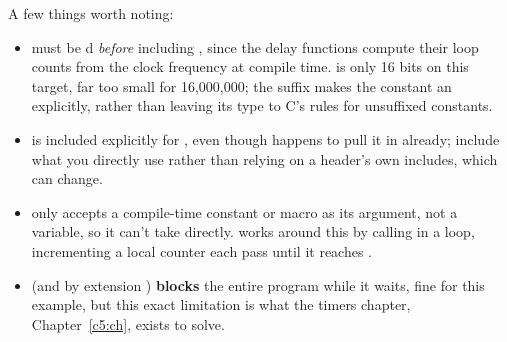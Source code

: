 \noindent A few things worth noting:
\begin{itemize}
  \item {} must be d \emph{before} including , since
    the delay functions compute their loop counts from the clock frequency at compile time.
     is only 16 bits on this target, far too small for 16{,}000{,}000; the 
    suffix makes the constant an  explicitly, rather than leaving its type to
    C's rules for unsuffixed constants.
  \item {} is included explicitly for , even though 
    happens to pull it in already; include what you directly use rather than relying on a header's
    own includes, which can change.
  \item {} only accepts a compile-time constant or macro as its argument, not a
    variable, so it can't take  directly.  works around this by calling
     in a loop, incrementing a local counter each pass until it reaches
    .
  \item {} (and by extension ) \textbf{blocks} the entire program
    while it waits, fine for this example, but this exact limitation is what the timers chapter,
    Chapter~\ref{c5:ch}, exists to solve.
\end{itemize}
